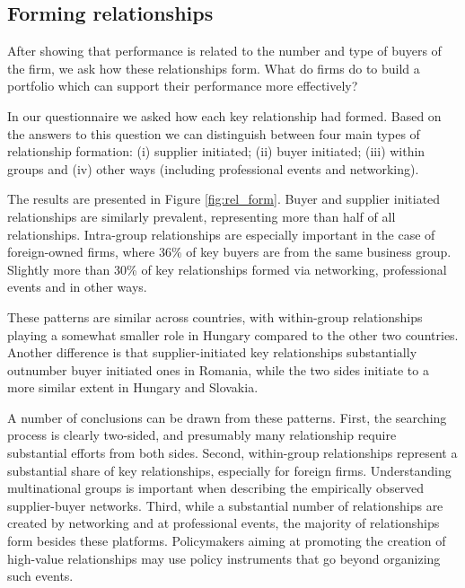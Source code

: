 \documentclass[final, dvipsnames, authoryear,12pt]{elsarticle}
\begin{document}
\subsection{Forming relationships}

After showing that performance is related to the number and type of buyers of the firm, we ask how these relationships form. What do firms do to build a portfolio which can support their performance more effectively?

In our questionnaire we asked how each key relationship had formed. Based on the answers to this question we can distinguish between four main types of relationship formation: (i) supplier initiated; (ii) buyer initiated; (iii) within groups and (iv) other ways (including professional events and networking). 

The results are presented in Figure \ref{fig:rel_form}. Buyer and supplier initiated relationships are similarly prevalent, representing more than half of all relationships. Intra-group relationships are especially important in the case of foreign-owned firms, where 36\% of key buyers are from the same business group. Slightly more than 30\% of key relationships formed via networking, professional events and in other ways. 

These patterns are similar across countries, with within-group relationships playing a somewhat smaller role in Hungary compared to the other two countries. Another difference is that supplier-initiated key relationships substantially outnumber buyer initiated ones in Romania, while the two sides initiate to a more similar extent in Hungary and Slovakia.

A number of conclusions can be drawn from these patterns. First, the searching process is clearly two-sided, and presumably many relationship require substantial efforts from both sides. Second, within-group relationships represent a substantial share of key relationships, especially for foreign firms. Understanding multinational groups is important when describing the empirically observed supplier-buyer networks. Third, while a substantial number of relationships are created by networking and at professional events, the majority of relationships form besides these platforms. Policymakers aiming at promoting the creation of high-value relationships may use policy instruments that go beyond organizing such events. 
\end{document}
